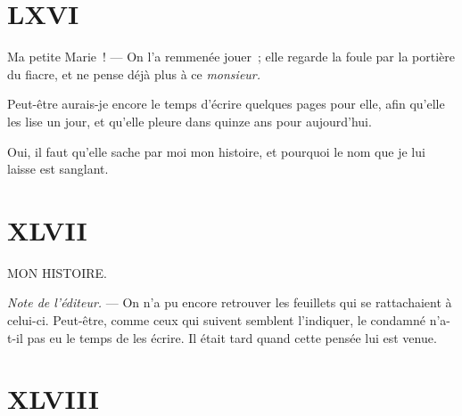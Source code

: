 \documentclass[french,twoside]{book} %
\begin{document}
 \section[{LXVI}]{LXVI}
\label{ch46}\renewcommand{\leftmark}{LXVI}

\noindent Ma petite Marie ! — On l’a remmenée jouer ; elle regarde la foule par la portière du fiacre, et ne pense déjà plus à ce \emph{monsieur.}\par
Peut-être aurais-je encore le temps d’écrire quelques pages pour elle, afin qu’elle les lise un jour, et qu’elle pleure dans quinze ans pour aujourd’hui.\par
Oui, il faut qu’elle sache par moi mon histoire, et pourquoi le nom que je lui laisse est sanglant.
 \section[{XLVII}]{XLVII}
\label{ch47}\renewcommand{\leftmark}{XLVII}

\begin{center}MON HISTOIRE.\end{center}
\noindent \emph{Note de l’éditeur.} — On n’a pu encore retrouver les feuillets qui se rattachaient à celui-ci. Peut-être, comme ceux qui suivent semblent l’indiquer, le condamné n’a-t-il pas eu le temps de les écrire. Il était tard quand cette pensée lui est venue.
 \section[{XLVIII}]{XLVIII}
\label{ch48}\renewcommand{\leftmark}{XLVIII}
\end{document}
